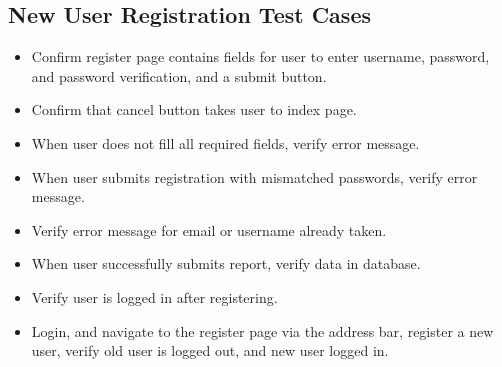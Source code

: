 \subsection{ New User Registration Test Cases}
\begin{itemize}
\item Confirm register page contains fields for user to enter username, password, and password verification, and a submit button.
\item Confirm that cancel button takes user to index page.
\item When user does not fill all required fields, verify error message.
\item When user submits registration with mismatched passwords, verify error message.
\item Verify error message for email or username already taken.
\item When user successfully submits report, verify data in database.
\item Verify user is logged in after registering.
\item Login, and navigate to the register page via the address bar, register a new user, verify old user is logged out, and new user logged in.
\end{itemize}

